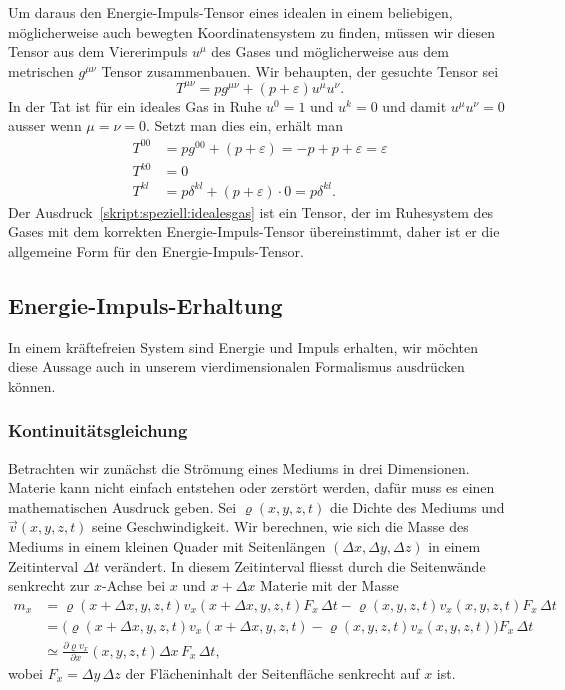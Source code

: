 Um daraus den Energie-Impuls-Tensor eines idealen in einem
beliebigen, möglicherweise auch bewegten Koordinatensystem zu
finden, müssen wir diesen Tensor aus dem Viererimpuls $u^\mu$
des Gases und möglicherweise aus dem metrischen $g^{\mu\nu}$ Tensor
zusammenbauen.
Wir behaupten, der gesuchte Tensor sei
\begin{equation}
T^{\mu\nu}
=
p g^{\mu\nu} + (p + \varepsilon)u^\mu u^\nu.
\label{skript:speziell:idealesgas}
\end{equation}
In der Tat ist für ein ideales Gas in Ruhe $u^0=1$ und $u^k=0$ und damit
$u^\mu u^\nu=0$ ausser wenn $\mu=\nu=0$.
Setzt man dies ein, erhält man
\begin{align*}
T^{00}
&=
pg^{00} + (p+\varepsilon) = -p+p+\varepsilon=\varepsilon
\\
T^{k0}
&=0
\\
T^{kl}
&=
p\delta^{kl}
+
(p+\varepsilon)\cdot 0
=
p\delta^{kl}.
\end{align*}
Der Ausdruck~\eqref{skript:speziell:idealesgas} ist ein Tensor, der
im Ruhesystem des Gases mit dem korrekten Energie-Impuls-Tensor
übereinstimmt,
daher ist er die allgemeine Form für den Energie-Impuls-Tensor.

\subsection{Energie-Impuls-Erhaltung}
%
In einem kräftefreien System sind Energie und Impuls erhalten, wir
möchten diese Aussage auch in unserem vierdimensionalen Formalismus
ausdrücken können.

\subsubsection{Kontinuitätsgleichung}
Betrachten wir zunächst die Strömung eines Mediums in drei Dimensionen.
Materie kann nicht einfach entstehen oder zerstört werden, dafür muss
es einen mathematischen Ausdruck geben.
Sei $\varrho(x,y,z,t)$ die Dichte des Mediums und $\vec v(x,y,z,t)$ 
seine Geschwindigkeit.
Wir berechnen, wie sich die Masse des Mediums in einem kleinen
Quader mit Seitenlängen $(\Delta x, \Delta y, \Delta z)$ in einem
Zeitinterval $\Delta t$ verändert.
In diesem Zeitinterval fliesst durch die Seitenwände senkrecht zur
$x$-Achse bei $x$ und $x+\Delta x$ 
Materie mit der Masse
\begin{align*}
m_x
&=
\varrho(x+\Delta x,y,z,t) v_x(x+\Delta x,y,z,t) F_x\,\Delta t
-\varrho(x,y,z,t) v_x(x,y,z,t) F_x\,\Delta t
\\
&=
\bigl(\varrho(x+\Delta x,y,z,t)
v_x(x+\Delta x,y,z,t) -\varrho(x,y,z,t) v_x(x,y,z,t)\bigr) F_x\,\Delta t
\\
&\simeq
\frac{\partial \varrho v_x}{\partial x}(x,y,z,t)\Delta x\, F_x\,\Delta t,
\end{align*}
wobei $F_x=\Delta y\,\Delta z$ der Flächeninhalt der Seitenfläche senkrecht
auf $x$ ist.

